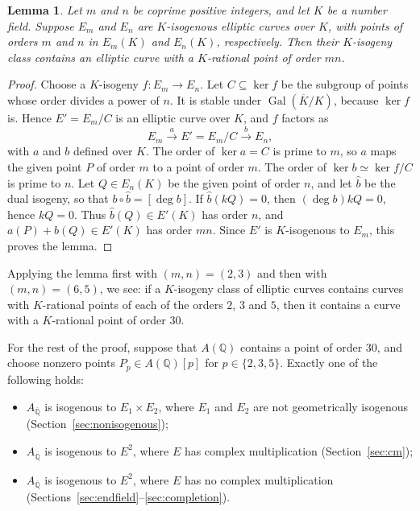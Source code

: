 \documentclass[11pt]{article}
\newtheorem{lemma}{Lemma}
\newcommand{\Q}{\mathbb Q}
\DeclareMathOperator{\Gal}{Gal}
\begin{document}
\begin{lemma}\label{lem:combine}
Let \(m\) and \(n\) be coprime positive integers, and let \(K\) be a
number field. Suppose \(E_m\) and \(E_n\) are \(K\)-isogenous
elliptic curves over \(K\), with points of orders \(m\) and \(n\) in
\(E_m(K)\) and \(E_n(K)\), respectively. Then their \(K\)-isogeny
class contains an elliptic curve with a \(K\)-rational point of order
\(mn\).
\end{lemma}

\begin{proof}
Choose a \(K\)-isogeny \(f:E_m\to E_n\). Let \(C\subseteq\ker f\) be
the subgroup of points whose order divides a power of \(n\). It is
stable under \(\Gal(\overline K/K)\), because \(\ker f\) is. Hence
\(E'=E_m/C\) is an elliptic curve over \(K\), and \(f\) factors as
\[
 E_m\xrightarrow{\;a\;}E'=E_m/C\xrightarrow{\;b\;}E_n,
\]
with \(a\) and \(b\) defined over \(K\). The order of \(\ker a=C\) is
prime to \(m\), so \(a\) maps the given point \(P\) of order \(m\) to a
point of order \(m\). The order of \(\ker b\simeq\ker f/C\) is prime to
\(n\). Let \(Q\in E_n(K)\) be the given point of order \(n\), and let
\(\hat b\) be the dual isogeny, so that \(b\circ\hat b=[\deg b]\). If
\(\hat b(kQ)=0\), then \((\deg b)kQ=0\), hence \(kQ=0\). Thus
\(\hat b(Q)\in E'(K)\) has order \(n\), and
\(a(P)+\hat b(Q)\in E'(K)\) has order \(mn\). Since \(E'\) is
\(K\)-isogenous to \(E_m\), this proves the lemma.
\end{proof}

Applying the lemma first with \((m,n)=(2,3)\) and then with
\((m,n)=(6,5)\), we see: if a \(K\)-isogeny class of elliptic curves
contains curves with \(K\)-rational points of each of the orders
\(2\), \(3\) and \(5\), then it contains a curve with a
\(K\)-rational point of order \(30\).

For the rest of the proof, suppose that \(A(\Q)\) contains a point of
order \(30\), and choose nonzero points \(P_p\in A(\Q)[p]\) for
\(p\in\{2,3,5\}\). Exactly one of the following holds:
\begin{itemize}
\item \(A_{\overline{\Q}}\) is isogenous to \(E_1\times E_2\), where
\(E_1\) and \(E_2\) are not geometrically isogenous
(Section~\ref{sec:nonisogenous});
\item \(A_{\overline{\Q}}\) is isogenous to \(E^2\), where \(E\) has
complex multiplication (Section~\ref{sec:cm});
\item \(A_{\overline{\Q}}\) is isogenous to \(E^2\), where \(E\) has
no complex multiplication
(Sections~\ref{sec:endfield}--\ref{sec:completion}).
\end{itemize}
\end{document}
